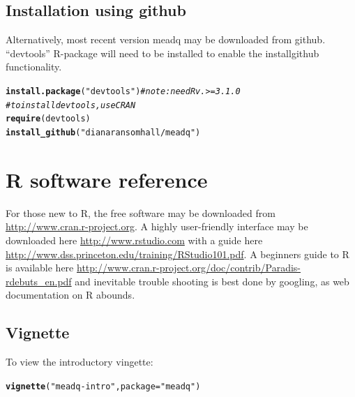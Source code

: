 \documentclass{article}\usepackage[]{graphicx}\usepackage[]{color}
\makeatletter
\newcommand{\hlstr}[1]{\textcolor[rgb]{0.192,0.494,0.8}{#1}}%
\newcommand{\hlcom}[1]{\textcolor[rgb]{0.678,0.584,0.686}{\textit{#1}}}%
\newcommand{\hlstd}[1]{\textcolor[rgb]{0.345,0.345,0.345}{#1}}%
\newcommand{\hlkwc}[1]{\textcolor[rgb]{0.333,0.667,0.333}{#1}}%
\newcommand{\hlkwd}[1]{\textcolor[rgb]{0.737,0.353,0.396}{\textbf{#1}}}%
\newenvironment{kframe}{%
 \def\at@end@of@kframe{}%
 \ifinner\ifhmode%
  \def\at@end@of@kframe{\end{minipage}}%
  \begin{minipage}{\columnwidth}%
 \fi\fi%
 \def\FrameCommand##1{\hskip\@totalleftmargin \hskip-\fboxsep
 \colorbox{shadecolor}{##1}\hskip-\fboxsep
     \hskip-\linewidth \hskip-\@totalleftmargin \hskip\columnwidth}%
 \MakeFramed {\advance\hsize-\width
   \@totalleftmargin\z@ \linewidth\hsize
   \@setminipage}}%
 {\par\unskip\endMakeFramed%
 \at@end@of@kframe}
\newenvironment{knitrout}{}{} %
\makeatother
\begin{document}
\subsection*{Installation using github }
Alternatively, most recent version meadq may be downloaded from github. ``devtools'' R-package will need to be installed to enable the install\textunderscore github functionality. 
\begin{knitrout}
\color{fgcolor}\begin{kframe}
\begin{alltt}
\hlkwd{install.package}\hlstd{(}\hlstr{"devtools"}\hlstd{)}  \hlcom{# note: need R v.>=3.1.0}
\hlcom{# to install devtools, use CRAN}
\hlkwd{require}\hlstd{(devtools)}
\hlkwd{install_github}\hlstd{(}\hlstr{"dianaransomhall/meadq"}\hlstd{)}
\end{alltt}
\end{kframe}
\end{knitrout}



\section{R software reference}
For those new to R, the free software may be downloaded from \url{http://www.cran.r-project.org}.  A highly user-friendly interface may be downloaded here \url{http://www.rstudio.com} with a guide here \url{http://www.dss.princeton.edu/training/RStudio101.pdf}.  A beginners guide to R is available here \url{http://www.cran.r-project.org/doc/contrib/Paradis-rdebuts_en.pdf} and inevitable trouble shooting is best done by googling, as web documentation on R abounds.

\subsection*{Vignette}
To view the introductory vingette:
\begin{knitrout}
\color{fgcolor}\begin{kframe}
\begin{alltt}
\hlkwd{vignette}\hlstd{(}\hlstr{"meadq-intro"}\hlstd{,} \hlkwc{package} \hlstd{=} \hlstr{"meadq"}\hlstd{)}
\end{alltt}
\end{kframe}
\end{knitrout}
\end{document}
